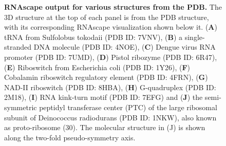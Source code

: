 \begin{center}
    \begin{figure}
        \caption[RNAscape output for various structures from the PDB.]{\textbf{RNAscape output for various structures from the PDB.} The 3D structure at the top of each panel is from the PDB structure, with its corresponding RNAscape visualization shown below it. ({\bf A}) tRNA from Sulfolobus tokodaii (PDB ID: 7VNV), ({\bf B}) a single-stranded DNA molecule (PDB ID: 4NOE), ({\bf C}) Dengue virus RNA promoter (PDB ID: 7UMD), ({\bf D}) Pistol ribozyme (PDB ID: 6R47), ({\bf E}) Riboswitch from Escherichia coli (PDB ID: 1Y26), ({\bf F}) Cobalamin riboswitch regulatory element (PDB ID: 4FRN), ({\bf G}) NAD-II riboswitch (PDB ID: 8HBA), ({\bf H}) G-quadruplex (PDB ID: 2M18), ({\bf I}) RNA kink-turn motif (PDB ID: 7EFG) and ({\bf J}) the semi-symmetric peptidyl transferase center (PTC) of the large ribosomal subunit of Deinococcus radiodurans (PDB ID: 1NKW), also known as proto-ribosome (30). The molecular structure in (J) is shown along the two-fold pseudo-symmetry axis.}
  \label{fig:rnascape1}
\end{figure}
\end{center}
